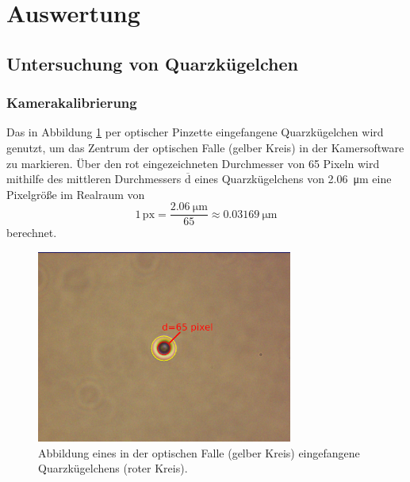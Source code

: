 \newpage
\section{Auswertung}

    \subsection{Untersuchung von Quarzkügelchen}
        \subsubsection{Kamerakalibrierung}
            Das in Abbildung \ref{fig:cal_cam} per optischer Pinzette eingefangene Quarzkügelchen wird genutzt, um das Zentrum der optischen Falle (gelber Kreis) in der Kamersoftware zu markieren. Über den
            rot eingezeichneten Durchmesser von 65 Pixeln wird mithilfe des mittleren Durchmessers $\overline{\text{d}}$ eines Quarzkügelchens von \SI{2.06}{\micro\metre} eine Pixelgröße im Realraum von 
            \begin{equation*}
                1\,\text{px} = \frac{\SI{2.06}{\micro\metre}}{65} \approx \SI{0.03169}{\micro\metre}
            \end{equation*}
            berechnet.
            \begin{figure}[h]
            \centering
            \includegraphics[width = 0.75\textwidth]{pictures/cal_cam.png}
            \caption{Abbildung eines in der optischen Falle (gelber Kreis) eingefangene Quarzkügelchens (roter Kreis).}
            \label{fig:cal_cam}
            \end{figure}
            \FloatBarrier

        \newpage
